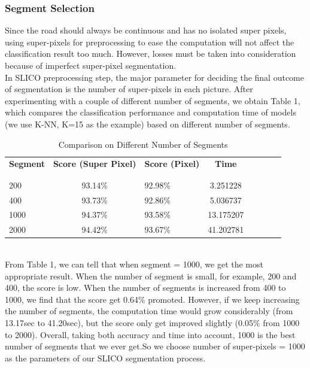 \documentclass{article} %
\begin{document}
\subsubsection{Segment Selection}
Since the road should always be continuous and has no isolated super pixels, using super-pixels for preprocessing to ease the computation will not affect the classification result too much. However, losses must be taken into consideration because of imperfect super-pixel segmentation.\\

In SLICO preprocessing step, the major parameter for deciding the final outcome of segmentation is the number of super-pixels in each picture. After experimenting with a couple of different number of segments, we obtain Table 1, which compares the classification performance and computation time of models (we use K-NN, K=15 as the example) based on different number of segments.\\
\begin{table}[h]
\centering
\caption{Comparison on Different Number of Segments}
\begin{tabular}{lclclclc|}
\\
\textbf{Segment} &\textbf{Score (Super Pixel)} &\textbf{Score (Pixel)} &\textbf{Time} \\
\\ \hline \\
200	 &93.14\%	 &92.98\%	 &3.251228 \\
400	 &93.73\%	 &92.86\%	 &5.036737 \\
1000	 &94.37\%	 &93.58\%	 &13.175207 \\
2000	 &94.42\%	 &93.67\%	 &41.202781 \\
\end{tabular}
\end{table}
\\
From Table 1, we can tell that when segment = 1000, we get the most appropriate result. When the number of segment is small, for example, 200 and 400, the score is low. When the number of segments is increased from 400 to 1000, we find that the score get 0.64\% promoted. However, if we keep increasing the number of segments, the computation time would grow considerably (from 13.17sec to 41.20sec), but the score only get improved slightly (0.05\% from 1000 to 2000). Overall, taking both accuracy and time into account, 1000 is the best number of segments that we ever get.So we choose number of super-pixels = 1000 as the parameters of our SLICO segmentation process.\\ 
\end{document}
